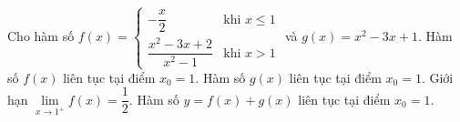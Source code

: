 \begin{ex}
Cho hàm số $f(x)=\begin{cases}-\dfrac x2&\text{khi }x\le1\\\dfrac{x^2-3x+2}{x^2-1}&\text{khi }x>1\end{cases}$ và $g(x)=x^2-3x+1$.
\choiceTF
{\True Hàm số $f(x)$ liên tục tại điểm $x_0=1$.}
{\True Hàm số $g(x)$ liên tục tại điểm $x_0=1$.}
{Giới hạn $\lim\limits_{x\to1^+}f(x)=\dfrac12$.}
{\True Hàm số $y=f(x)+g(x)$ liên tục tại điểm $x_0=1$.}
\end{ex}
